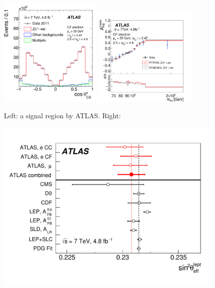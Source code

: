 


\begin{figure}[p]
    \centering
    \includegraphics[width=0.45\textwidth]{figures/ss-precision-afb-atlas-cf-ct.pdf}
    \includegraphics[width=0.45\textwidth]{figures/ss-precision-afb-atlas-cf-afb.pdf}
    \caption{
    Left:  a signal region by ATLAS.
    Right:  }
    \label{fig:ss-precision-afb-atlas-cf}
\end{figure}
\begin{figure}[p]
    \centering
    \includegraphics[height=0.3\textheight]{figures/ss-precision-afb-atlas-sin2thetaw.pdf}
    \caption{}
    \label{fig:ss-precision-afb-atlas-sin2thetaw}
\end{figure}
